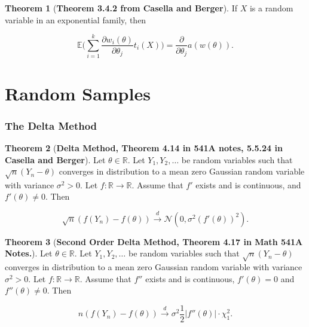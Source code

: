 \documentclass{article}
\newcommand{\pderiv}[2]{\frac{\partial #1}{\partial #2}}
\newcommand{\E}{\mathbb{E}}
\theoremstyle{definition}
\newtheorem{theorem}{Theorem}
\theoremstyle{definition}
\theoremstyle{definition}
\theoremstyle{definition}
\theoremstyle{definition}
\theoremstyle{definition}
\theoremstyle{definition}
\begin{document}
\begin{theorem}[\textbf{Theorem 3.4.2 from Casella and Berger}] If \(X\) is a random variable in an exponential family, then

\begin{equation}\label{prob.thm.3.4.2.casella}
\E \Bigg( \sum_{i=1}^k \pderiv{w_i(\theta)}{\theta_j} t_i(X) \Bigg) =  \pderiv{}{\theta_j}  a(w(\theta)).
\end{equation}

\end{theorem}


\section{Random Samples}

\subsubsection{The Delta Method}

\begin{theorem}[\textbf{Delta Method, Theorem 4.14 in 541A notes, 5.5.24 in Casella and Berger}]\label{mathstats.delta.method.thm} Let \(\theta \in \mathbb{R}\). Let \(Y_1, Y_2, \ldots\) be random variables such that \(\sqrt{n}(Y_n - \theta)\) converges in distribution to a mean zero Gaussian random variable with variance \(\sigma^2 > 0\). Let \(f: \mathbb{R} \to \mathbb{R}\). Assume that \(f'\) exists and is continuous, and \(f'(\theta) \neq 0\). Then

\[
\sqrt{n}(f(Y_n) - f(\theta)) \xrightarrow{d} \mathcal{N}(0, \sigma^2(f'(\theta))^2).
\]


\end{theorem}

\begin{theorem}[\textbf{Second Order Delta Method, Theorem 4.17 in Math 541A Notes.}]Let \(\theta \in \mathbb{R}\). Let \(Y_1, Y_2, \ldots\) be random variables such that \(\sqrt{n}(Y_n - \theta)\) converges in distribution to a mean zero Gaussian random variable with variance \(\sigma^2 > 0\). Let \(f: \mathbb{R} \to \mathbb{R}\). Assume that \(f''\) exists and is continuous, \(f'(\theta) = 0\) and \(f''(\theta) \neq 0\). Then

\[
n(f(Y_n) - f(\theta)) \xrightarrow{d} \sigma^2 \frac{1}{2} | f''(\theta)| \cdot \chi_1^2.
\]


\end{theorem}
\end{document}
